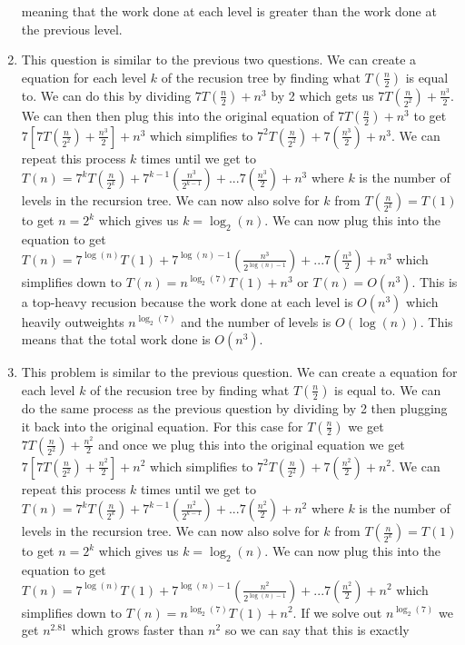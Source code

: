 \documentclass[12pt,letterpaper]{article}
\begin{document}
\begin{enumerate}
    meaning that the work done at each level is greater than the work done at the previous level.
    \item This question is similar to the previous two questions. We can create a equation for each level $k$ of the recusion tree by finding what $T(\frac{n}{2})$ is equal to.
    We can do this by dividing $7T(\frac{n}{2})+n^3$ by 2 which gets us $7T(\frac{n}{2^2})+\frac{n^3}{2}$. We can then
    then plug this into the original equation of $7T(\frac{n}{2})+n^3$ to get $7[7T(\frac{n}{2^2}) + \frac{n^3}{2}] + n^3$ which
    simplifies to $7^2T(\frac{n}{2^2}) + 7(\frac{n^3}{2}) + n^3$. We can repeat this process $k$ times until we get to $T(n) = 7^kT(\frac{n}{2^k}) + 7^{k-1}(\frac{n^3}{2^{k-1}})+ ... 7(\frac{n^3}{2}) + n^3$
    where $k$ is the number of levels in the recursion tree. We can now also solve for $k$ from $T(\frac{n}{2^k}) = T(1)$ to get 
    $n = 2^k$ which gives us $k = \log_2(n)$. We can now plug this into the equation to get $T(n) = 7^{\log(n)}T(1) + 7^{\log(n)-1}(\frac{n^3}{2^{\log(n)-1}})+ ... 7(\frac{n^3}{2}) + n^3$ which
    simplifies down to $T(n) = n^{\log_2(7)}T(1) + n^3$ or $T(n) = O(n^3)$. This is a top-heavy recusion because the work done at each
    level is $O(n^3)$ which heavily outweights $n^{\log_2(7)}$ and the number of levels is $O(\log(n))$. This means that the total work done is $O(n^3)$.
    \item This problem is similar to the previous question. We can create a equation for each level $k$ of the recusion tree by finding what $T(\frac{n}{2})$ is equal to.
    We can do the same process as the previous question by dividing by 2 then plugging it back into the original equation. For this case for $T(\frac{n}{2})$
    we get $7T(\frac{n}{2^2}) + \frac{n^2}{2}$ and once we plug this into the original equation we get $7[7T(\frac{n}{2^2}) + \frac{n^2}{2}] + n^2$ which
    simplifies to $7^2T(\frac{n}{2^2}) + 7(\frac{n^2}{2}) + n^2$. We can repeat this process $k$ times until we get to $T(n) = 7^kT(\frac{n}{2^k}) + 7^{k-1}(\frac{n^2}{2^{k-1}})+ ... 7(\frac{n^2}{2}) + n^2$
    where $k$ is the number of levels in the recursion tree. We can now also solve for $k$ from $T(\frac{n}{2^k}) = T(1)$ to get 
    $n = 2^k$ which gives us $k = \log_2(n)$. We can now plug this into the equation to get $T(n) = 7^{\log(n)}T(1) + 7^{\log(n)-1}(\frac{n^2}{2^{\log(n)-1}})+ ... 7(\frac{n^2}{2}) + n^2$ which
    simplifies down to $T(n) = n^{\log_2(7)}T(1) + n^2$. If we solve out $n^{\log_2(7)}$ we get $n^{2.81}$ which grows faster than $n^2$ so we can say that this is exactly

\end{enumerate}
\end{document}
